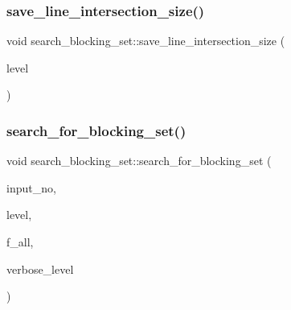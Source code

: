 \subsubsection{\texorpdfstring{save\+\_\+line\+\_\+intersection\+\_\+size()}{save\_line\_intersection\_size()}}
{\footnotesize\ttfamily void search\+\_\+blocking\+\_\+set\+::save\+\_\+line\+\_\+intersection\+\_\+size (\begin{DoxyParamCaption}\item[{\mbox{\hyperlink{galois_8h_a09fddde158a3a20bd2dcadb609de11dc}{I\+NT}}}]{level }\end{DoxyParamCaption})}

\mbox{\label{classsearch__blocking__set_aea252e95af01eb415908fafbe1875a52}} 
\subsubsection{\texorpdfstring{search\+\_\+for\+\_\+blocking\+\_\+set()}{search\_for\_blocking\_set()}}
{\footnotesize\ttfamily void search\+\_\+blocking\+\_\+set\+::search\+\_\+for\+\_\+blocking\+\_\+set (\begin{DoxyParamCaption}\item[{\mbox{\hyperlink{galois_8h_a09fddde158a3a20bd2dcadb609de11dc}{I\+NT}}}]{input\+\_\+no,  }\item[{\mbox{\hyperlink{galois_8h_a09fddde158a3a20bd2dcadb609de11dc}{I\+NT}}}]{level,  }\item[{\mbox{\hyperlink{galois_8h_a09fddde158a3a20bd2dcadb609de11dc}{I\+NT}}}]{f\+\_\+all,  }\item[{\mbox{\hyperlink{galois_8h_a09fddde158a3a20bd2dcadb609de11dc}{I\+NT}}}]{verbose\+\_\+level }\end{DoxyParamCaption})}

\mbox{\label{classsearch__blocking__set_a40f8e6200ebf133284aef437dfc4204e}} 
